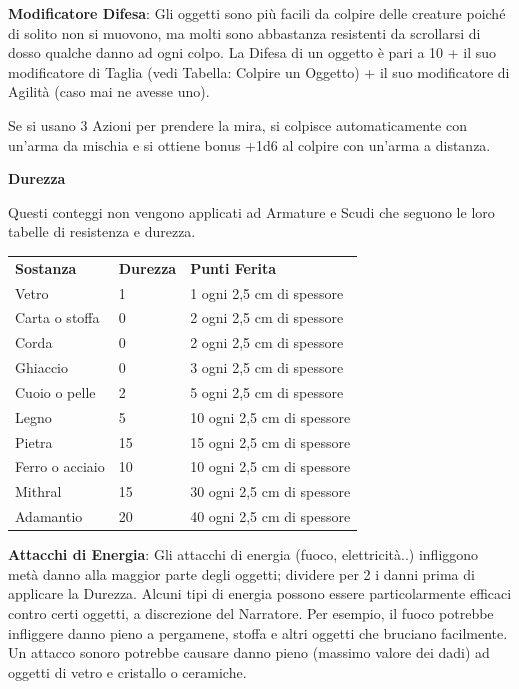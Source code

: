 \documentclass[a4paper,11pt,twoside,openany]{book}
\begin{document}
\bigskip

\textbf{Modificatore Difesa}: Gli oggetti sono più facili da colpire delle creature poiché di solito non si muovono, ma molti sono abbastanza resistenti da scrollarsi di dosso qualche danno ad ogni colpo. La Difesa di un oggetto è pari a 10 + il suo modificatore di Taglia (vedi Tabella: Colpire un Oggetto) + il suo modificatore di Agilità (caso mai ne avesse uno).

Se si usano 3 Azioni per prendere la mira, si colpisce automaticamente con un'arma da mischia e si ottiene bonus +1d6 al colpire con un'arma a distanza.

\textbf{Durezza}

Questi conteggi non vengono applicati ad Armature e Scudi che seguono le loro tabelle di resistenza e durezza.

\bigskip

\begin{tabular}{lll}
	\toprule
	\textbf{Sostanza} & \textbf{Durezza} & \textbf{Punti Ferita} \\
	Vetro             & 1                & 1 ogni 2,5 cm di spessore\\
	Carta o stoffa    & 0                & 2 ogni 2,5 cm di spessore\\
	Corda             & 0                & 2 ogni 2,5 cm di spessore\\
	Ghiaccio          & 0                & 3 ogni 2,5 cm di spessore\\
	Cuoio o pelle     & 2                & 5 ogni 2,5 cm di spessore\\
	Legno             & 5                & 10 ogni 2,5 cm di spessore\\
	Pietra            & 15               & 15 ogni 2,5 cm di spessore\\
	Ferro o acciaio   & 10               & 10 ogni 2,5 cm di spessore\\
	Mithral           & 15               & 30 ogni 2,5 cm di spessore\\
	Adamantio         & 20               & 40 ogni 2,5 cm di spessore\\
\end{tabular}

\bigskip

\textbf{Attacchi di Energia}: Gli attacchi di energia (fuoco, elettricità..) infliggono metà danno alla maggior parte degli oggetti; dividere per 2 i danni prima di applicare la Durezza. Alcuni tipi di energia possono essere particolarmente efficaci contro certi oggetti, a discrezione del Narratore.
Per esempio, il fuoco potrebbe infliggere danno pieno a pergamene, stoffa e altri oggetti che bruciano facilmente. Un attacco sonoro potrebbe causare danno pieno (massimo valore dei dadi) ad oggetti di vetro e cristallo o ceramiche.
\end{document}
